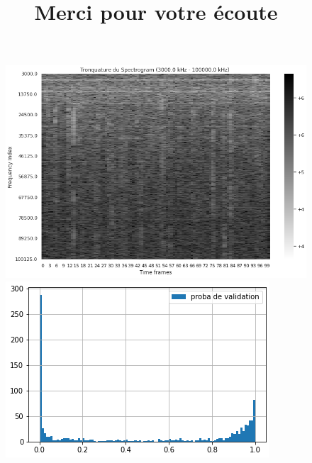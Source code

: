 \documentclass{beamer}
\theoremstyle{definition}
\begin{document}
\begin{frame}
\begin{minipage}[t]{1\linewidth}
\begin{minipage}[t]{0.42\linewidth}
\begin{figure}
		\end{figure}\end{minipage}\hfill 
		\begin{minipage}[t]{0.55\linewidth}\centering\begin{figure}
				\begin{center}
					\centering
					\includegraphics[width=0.8\linewidth]{19.png}\\
					
					\includegraphics[width=0.8\linewidth]{val.png}
				\end{center}
				
		\end{figure}\end{minipage}
	\end{minipage}	
\end{frame}
\title{Merci pour votre écoute}
\author{}
\date{}
\end{document}
